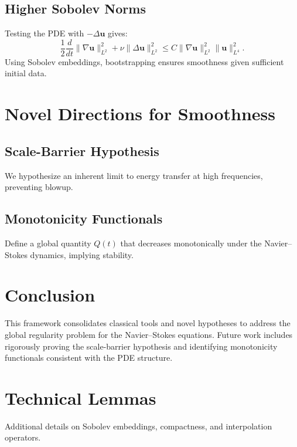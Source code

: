 \subsection{Higher Sobolev Norms}
Testing the PDE with $-\Delta \mathbf{u}$ gives:
\begin{equation}
    \frac{1}{2} \frac{d}{dt} \|\nabla \mathbf{u}\|_{L^2}^2 + \nu \|\Delta \mathbf{u}\|_{L^2}^2 \leq C \|\nabla \mathbf{u}\|_{L^2}^2 \|\mathbf{u}\|_{L^4}^2.
\end{equation}
Using Sobolev embeddings, bootstrapping ensures smoothness given sufficient initial data.

\section{Novel Directions for Smoothness}
\subsection{Scale-Barrier Hypothesis}
We hypothesize an inherent limit to energy transfer at high frequencies, preventing blowup.
\subsection{Monotonicity Functionals}
Define a global quantity $Q(t)$ that decreases monotonically under the Navier--Stokes dynamics, implying stability.

\section{Conclusion}
This framework consolidates classical tools and novel hypotheses to address the global regularity problem for the Navier--Stokes equations. Future work includes rigorously proving the scale-barrier hypothesis and identifying monotonicity functionals consistent with the PDE structure.

\appendix
\section{Technical Lemmas}
Additional details on Sobolev embeddings, compactness, and interpolation operators.

